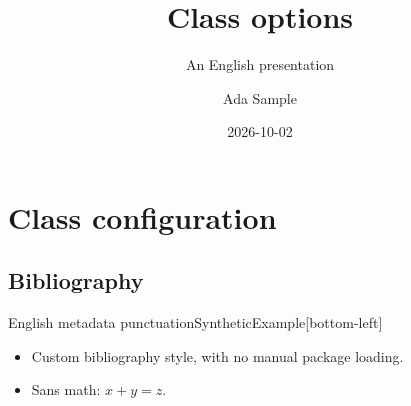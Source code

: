 \documentclass[
  language=english,
  bibstyle=authoryear,
  bibsorting=nyt,
  mathfont=sans,
  navigation=false,
  cornerwidth=5.2cm
]{campusbeamer}
\title{Class options}
\subtitle{An English presentation}
\author{Ada Sample}
\date{2026-10-02}
\begin{document}
\maketitle
\section{Class configuration}
\sectiontocpage
{}
\subsection{Bibliography}
\begin{paperframe}{English metadata punctuation}{SyntheticExample}[bottom-left]
  \begin{itemize}
    \item Custom bibliography style, with no manual package loading.
    \item Sans math: $x+y=z$.
  \end{itemize}
\end{paperframe}
\backmatter
\end{document}
